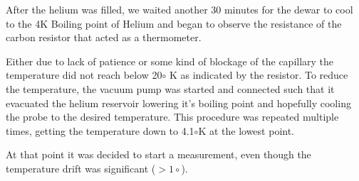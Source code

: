 After the helium was filled, we waited another 30 minutes for the dewar to cool to the 4K Boiling point of Helium and began to observe the resistance
of the carbon resistor that acted as a thermometer.

Either due to lack of patience or some kind of blockage of the capillary the temperature did not reach below 20$\circ$ K as indicated by the resistor.
To reduce the temperature, the vacuum pump was started and connected such that it evacuated the helium reservoir lowering it's boiling point and
hopefully cooling the probe to the desired temperature. This procedure was repeated multiple times, getting the temperature down to 4.1$\circ$K at the
lowest point.

At that point it was decided to start a measurement, even though the temperature drift was significant ($>1\circ$).

